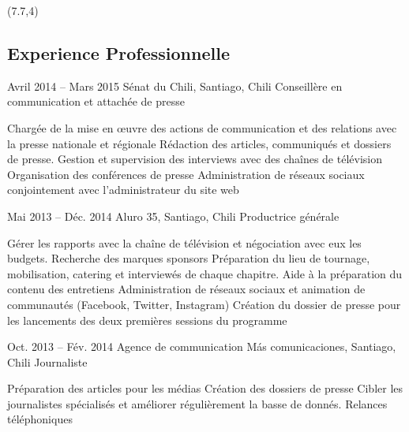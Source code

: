 \documentclass{tccv}
\begin{document}

\begin{textblock}{13}(7.7,4)
\begin{mdframed}
\section{Experience Professionnelle}


\begin{eventlist}
\item{Avril 2014 -- Mars 2015}
     {Sénat du Chili, Santiago, Chili}
     {Conseillère en communication et attachée de presse}

     
    \begin{itemize}
      \setlength\itemsep{0cm} 
      \cvitem[\checkmark] Chargée de la mise en œuvre des actions de communication et des relations avec la presse nationale et régionale
      \cvitem[\checkmark] Rédaction des articles, communiqués et dossiers de presse. Gestion et supervision des interviews avec des chaînes de télévision
      \cvitem[\checkmark] Organisation des conférences de presse
      \cvitem[\checkmark] Administration de réseaux sociaux conjointement avec l’administrateur du site web
    \end{itemize}     
     


\item{Mai 2013 -- Déc. 2014}
     {Aluro 35, Santiago, Chili}
     {Productrice générale}
    
    \begin{itemize}
      \setlength\itemsep{0cm} 
      \cvitem[\checkmark] Gérer les rapports avec la chaîne de télévision et négociation avec eux les budgets. Recherche des marques sponsors
      \cvitem[\checkmark] Préparation du lieu de tournage, mobilisation, catering et interviewés de chaque chapitre. Aide à la préparation du contenu des entretiens
      \cvitem[\checkmark] Administration de réseaux sociaux et animation de communautés (Facebook, Twitter, Instagram)
      \cvitem[\checkmark] Création du dossier de presse pour les lancements des deux premières sessions du programme

    \end{itemize}     

\item{Oct. 2013 -- Fév. 2014 }     
  {Agence de communication Más comunicaciones, Santiago, Chili}     
  {Journaliste}

\begin{itemize}
      \setlength\itemsep{0cm} 
      \cvitem[\checkmark] Préparation des articles pour les médias
      \cvitem[\checkmark] Création des dossiers de presse 
      \cvitem[\checkmark] Cibler les journalistes spécialisés et améliorer régulièrement la basse de donnés. 
      \cvitem[\checkmark] Relances téléphoniques
\end{itemize}       




\end{eventlist}
\end{mdframed}
\end{textblock}
\end{document}
